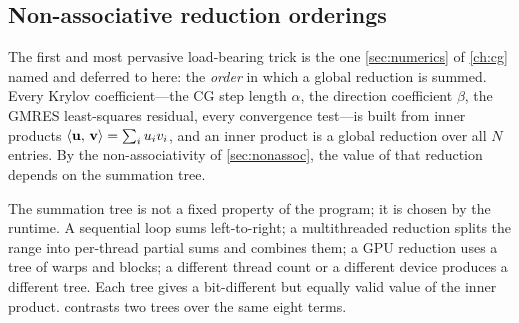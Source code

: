 \subsection{Non-associative reduction orderings}
\label{sec:reduction}

The first and most pervasive load-bearing trick is the one \cref{sec:numerics} of
\cref{ch:cg} named and deferred to here: the \emph{order} in which a global
reduction is summed. Every Krylov coefficient---the CG step length $\alpha$, the
direction coefficient $\beta$, the GMRES least-squares residual, every convergence
test---is built from inner products $\left\langle \mathbf{u},\, \mathbf{v}\right\rangle = \sum_i u_i v_i$, and an
inner product is a global reduction over all $N$ entries. By the non-associativity
of \cref{sec:nonassoc}, the value of that reduction depends on the summation tree.

The summation tree is not a fixed property of the program; it is chosen by the
runtime. A sequential loop sums left-to-right; a multithreaded reduction splits the
range into per-thread partial sums and combines them; a GPU reduction uses a
tree of warps and blocks; a different thread count or a different device produces a
different tree. Each tree gives a bit-different but equally valid value of the inner
product.  contrasts two trees over the same eight terms.


